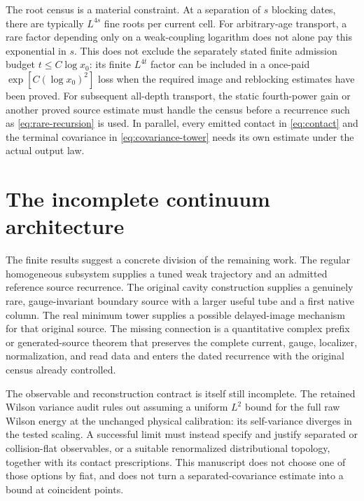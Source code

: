 The root census is a material constraint. At a separation of $s$ blocking dates, there are typically $L^{4s}$ fine roots per current cell. For arbitrary-age transport, a rare factor depending only on a weak-coupling logarithm does not alone pay this exponential in $s$. This does not exclude the separately stated finite admission budget $t\le C\log x_0$: its finite $L^{4t}$ factor can be included in a once-paid $\exp[C(\log x_0)^2]$ loss when the required image and reblocking estimates have been proved. For subsequent all-depth transport, the static fourth-power gain or another proved source estimate must handle the census before a recurrence such as \eqref{eq:rare-recursion} is used. In parallel, every emitted contact in \eqref{eq:contact} and the terminal covariance in \eqref{eq:covariance-tower} needs its own estimate under the actual output law.

\section{The incomplete continuum architecture}

The finite results suggest a concrete division of the remaining work. The regular homogeneous subsystem supplies a tuned weak trajectory and an admitted reference source recurrence. The original cavity construction supplies a genuinely rare, gauge-invariant boundary source with a larger useful tube and a first native column. The real minimum tower supplies a possible delayed-image mechanism for that original source. The missing connection is a quantitative complex prefix or generated-source theorem that preserves the complete current, gauge, localizer, normalization, and read data and enters the dated recurrence with the original census already controlled.

The observable and reconstruction contract is itself still incomplete. The retained Wilson variance audit  rules out assuming a uniform $L^2$ bound for the full raw Wilson energy at the unchanged physical calibration: its self-variance diverges in the tested scaling. A successful limit must instead specify and justify separated or collision-flat observables, or a suitable renormalized distributional topology, together with its contact prescriptions. This manuscript does not choose one of those options by fiat, and does not turn a separated-covariance estimate into a bound at coincident points.

